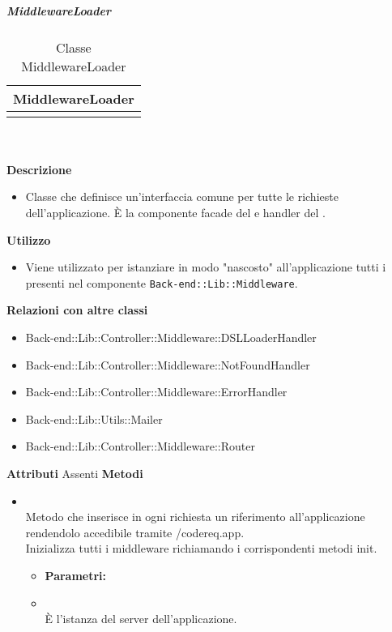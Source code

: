 			\subparagraph{MiddlewareLoader} 
\begin{table}[ht]
\begin{center}
\bgroup
	\setlength{\arrayrulewidth}{0.6mm}
	\def\arraystretch{1}
		\begin{tabular}{ | p{12cm} | }
				\hline  
					\centerline{\textbf{MiddlewareLoader}}
		\\ \hline 
				\hline
					\code{+ init ( ServerApp : app )} \\ 
				\hline
		
		\end{tabular}
\egroup
\caption{Classe MiddlewareLoader}
\end{center}
\end{table} \textbf{\\ \\ Descrizione}
\begin{itemize}
\item[] Classe che definisce un'interfaccia comune per tutte le richieste dell'applicazione. È la componente facade del   e handler del  .
\end{itemize} 
\textbf{Utilizzo}
\begin{itemize}
\item[] Viene utilizzato per istanziare in modo "nascosto" all'applicazione tutti i  presenti nel componente \texttt{Back-end::Lib::Middleware}.
\end{itemize}
\textbf{Relazioni con altre classi}
\begin{itemize}
\item{Back-end::Lib::Controller::Middleware::DSLLoaderHandler}
\item{Back-end::Lib::Controller::Middleware::NotFoundHandler}
\item{Back-end::Lib::Controller::Middleware::ErrorHandler}
\item{Back-end::Lib::Utils::Mailer}
\item{Back-end::Lib::Controller::Middleware::Router}
\end{itemize}
\textbf{Attributi}
Assenti
\textbf{Metodi}
\begin{itemize}
\item[] \textbf{} \\ Metodo che inserisce in ogni richiesta un riferimento all'applicazione rendendolo accedibile  tramite /code{req.app}. \\
Inizializza tutti i middleware richiamando i corrispondenti metodi init.
\begin{itemize}\addtolength{\itemsep}{-0.5\baselineskip}
\item[] \textbf{Parametri:}
\item[]  \\ È l'istanza del server dell'applicazione.
\end{itemize}
\end{itemize}

